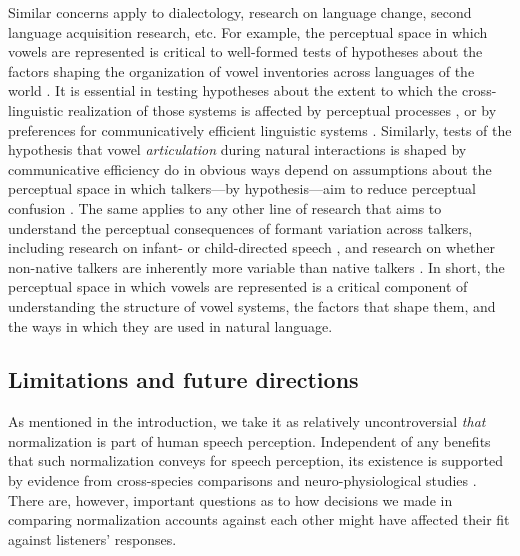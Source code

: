 \documentclass[preprint]{JASA}
\begin{document}
Similar concerns apply to dialectology, research on language change, second language acquisition research, etc. For example, the perceptual space in which vowels are represented is critical to well-formed tests of hypotheses about the factors shaping the organization of vowel inventories across languages of the world \citep{lindblom1986, stevens1972, stevens1989}. It is essential in testing hypotheses about the extent to which the cross-linguistic realization of those systems is affected by perceptual processes \citep{flemming2010, steriade2008}, or by preferences for communicatively efficient linguistic systems \citep[e.g.,][]{hall2018, lindblom1990, moulin2015}. Similarly, tests of the hypothesis that vowel \emph{articulation} during natural interactions is shaped by communicative efficiency do in obvious ways depend on assumptions about the perceptual space in which talkers---by hypothesis---aim to reduce perceptual confusion \citep[cf.][]{buz-jaeger2016, gahl2012, scarborough2010, wedel2018}. The same applies to any other line of research that aims to understand the perceptual consequences of formant variation across talkers, including research on infant- or child-directed speech \citep{eaves2016, kuhl1997}, and research on whether non-native talkers are inherently more variable than native talkers \citep{smith2019, vaughn2019, xie-jaeger2020}. In short, the perceptual space in which vowels are represented is a critical component of understanding the structure of vowel systems, the factors that shape them, and the ways in which they are used in natural language.

\subsection{Limitations and future directions}\label{limitations-and-future-directions}

As mentioned in the introduction, we take it as relatively uncontroversial \emph{that} normalization is part of human speech perception. Independent of any benefits that such normalization conveys for speech perception, its existence is supported by evidence from cross-species comparisons and neuro-physiological studies \citep[for review, see][]{barreda2020}. There are, however, important questions as to how decisions we made in comparing normalization accounts against each other might have affected their fit against listeners' responses.
\end{document}
